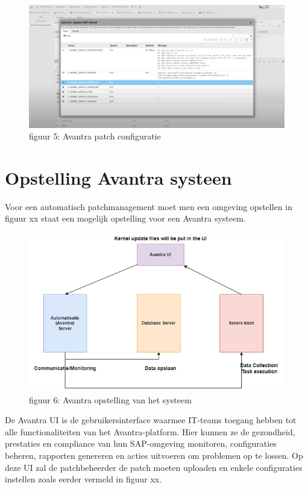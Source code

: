 \documentclass[dutch,dit,thesis]{hogentreport}
\begin{document}
\begin{figure}[htbp]
    \centering
    \includegraphics[width=\textwidth]{avantra3.png}
    \caption{figuur 5: Avantra patch configuratie}
     \label{fig:avantra1}
\end{figure}


\section{Opstelling Avantra systeen}
Voor een automatisch patchmanagement moet men een omgeving opstellen in figuur xx staat een mogelijk opstelling voor een Avantra systeem. 
\begin{figure}[htbp]
    \centering
    \includegraphics[width=\textwidth]{avantra4.png}
    \caption{figuur 6: Avantra opstelling van het systeem}
     \label{fig:avantra1}
\end{figure}






De Avantra UI is de gebruikersinterface waarmee IT-teams toegang hebben tot alle functionaliteiten van het Avantra-platform. Hier kunnen ze de gezondheid, prestaties en compliance van hun SAP-omgeving 
monitoren, configuraties beheren, rapporten genereren en acties uitvoeren om problemen op te lossen. Op deze UI zal de patchbeheerder de patch moeten uploaden en enkele configuraties instellen zoals eerder vermeld in figuur xx.
\end{document}
